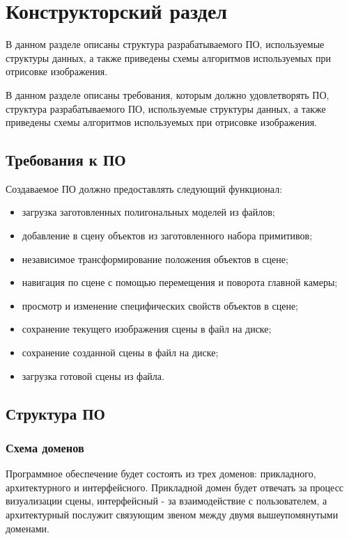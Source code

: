 \chapter{Конструкторский раздел}

В данном разделе описаны структура разрабатываемого ПО, используемые структуры данных, а также приведены схемы алгоритмов используемых при отрисовке изображения.

В данном разделе описаны требования, которым должно удовлетворять ПО, структура разрабатываемого ПО, используемые структуры данных, а также приведены схемы алгоритмов используемых при отрисовке изображения.

\section{Требования к ПО}

Создаваемое ПО должно предоставлять следующий функционал:

\begin{itemize}
	\item загрузка заготовленных полигональных моделей из файлов;
	\item добавление в сцену объектов из заготовленного набора примитивов;
	\item независимое трансформирование положения объектов в сцене;
	\item навигация по сцене с помощью перемещения и поворота главной камеры;
	\item просмотр и изменение специфических свойств объектов в сцене;
	\item сохранение текущего изображения сцены в файл на диске;
	\item сохранение созданной сцены в файл на диске;
	\item загрузка готовой сцены из файла.
\end{itemize}

\clearpage

\section{Структура ПО}

\subsection{Схема доменов}

Программное обеспечение будет состоять из трех доменов: прикладного, архитектурного и
интерфейсного. Прикладной домен будет отвечать за процесс визуализации сцены,
интерфейсный - за взаимодействие с пользователем, а архитектурный послужит связующим звеном между двумя вышеупомянутыми доменами.

